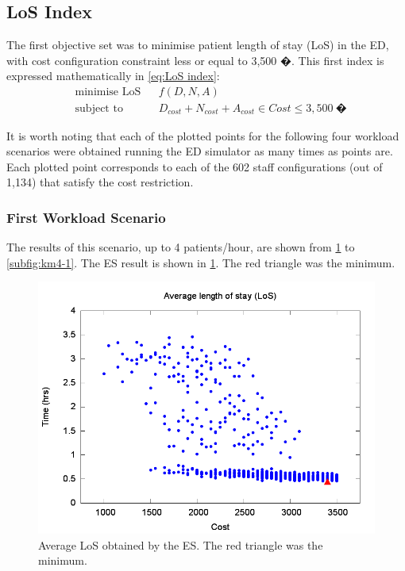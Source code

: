 \documentclass[11pt]{article} %
\begin{document}
\subsection{LoS Index}

The first objective set was to minimise patient length of stay (LoS)
in the ED, with cost configuration constraint less or equal to 3,500
�. This first index is expressed mathematically in \ref{eq:LoS index}:
\begin{equation}
\begin{aligned} & {\text{minimise LoS}} &  & f(D,N,A)\\
 & \text{subject to} &  & D_{cost}+N_{cost}+A_{cost}\in Cost\leq3,500\:\text{�}
\end{aligned}
\label{eq:LoS index}
\end{equation}


It is worth noting that each of the plotted points for the following
four workload scenarios were obtained running the ED simulator as
many times as points are. Each plotted point corresponds to each of
the 602 staff configurations (out of 1,134) that satisfy the cost
restriction.


\subsubsection{First Workload Scenario}

The results of this scenario, up to 4 patients/hour, are shown from
\ref{subfig:es4-1} to \ref{subfig:km4-1}. The ES result is shown
in \ref{subfig:es4-1}. The red triangle was the minimum. 
\begin{figure}[H]
\noindent \begin{centering}
\includegraphics[width=0.95\columnwidth,height=0.23\paperheight]{figs4/v0/6400-602-25-exh-LoS-min}
\par\end{centering}

\caption{Average LoS obtained by the ES. The red triangle was the minimum.
\label{subfig:es4-1}}
\end{figure}
\end{document}
